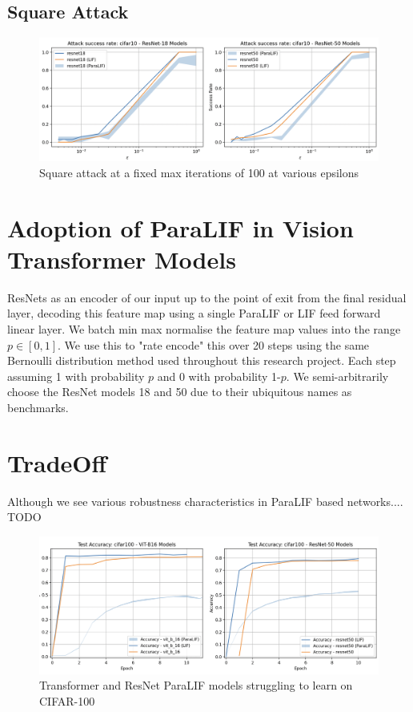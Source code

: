 \documentclass[conference]{IEEEtran}
\begin{document}
\subsection*{Square Attack}

\begin{figure}[h!]
    \centering
    \includegraphics[width=\linewidth]{resnet-square-cifar10.png}
    \caption{Square attack at a fixed max iterations of 100 at various epsilons}
    \label{fig:resnet_square_attack}
\end{figure}

\section{Adoption of ParaLIF in Vision Transformer Models}
ResNets as an encoder of our input up to the point of exit from the final residual layer, decoding this feature map using a single ParaLIF or LIF feed forward linear layer. We batch min max normalise the feature map values into the range $p \in [0,1]$. We use this to "rate encode" this over 20 steps using the same Bernoulli distribution method used throughout this research project. Each step assuming 1 with probability $p$ and 0 with probability 1-$p$. We semi-arbitrarily choose the ResNet models 18 and 50 due to their ubiquitous names as benchmarks.

\section{TradeOff}
Although we see various robustness characteristics in ParaLIF based networks.... TODO

\begin{figure}[h!]
    \centering
    \includegraphics[width=\linewidth]{resnet-transformer-cifar100.png}
    \caption{Transformer and ResNet ParaLIF models struggling to learn on CIFAR-100}
    \label{fig:resnet_transformer_cifar100}
\end{figure}
\end{document}
